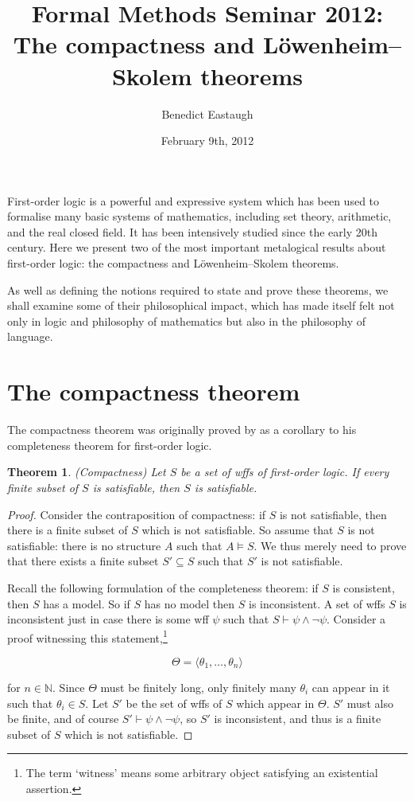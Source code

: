\documentclass[10pt, a4paper, oneside]{article}
\title{Formal Methods Seminar 2012:\\
       The compactness and Löwenheim--Skolem theorems}
\author{Benedict Eastaugh}
\date{February 9th, 2012}
\newtheorem{thm}{Theorem}[section]
\theoremstyle{definition}
\theoremstyle{remark}
\theoremstyle{plain}
\begin{document}
\maketitle

First-order logic is a powerful and expressive system which has been used to
formalise many basic systems of mathematics, including set theory, arithmetic,
and the real closed field. It has been intensively studied since the early 20th
century. Here we present two of the most important metalogical results about
first-order logic: the compactness and Löwenheim--Skolem theorems.

As well as defining the notions required to state and prove these theorems, we
shall examine some of their philosophical impact, which has made itself felt not
only in logic and philosophy of mathematics but also in the philosophy of
language.


\section{The compactness theorem}

The compactness theorem was originally proved by \citet{godel1930} as a
corollary to his completeness theorem for first-order logic.

\begin{thm}
    (Compactness) Let $S$ be a set of wffs of first-order logic. If every finite
    subset of $S$ is satisfiable, then $S$ is satisfiable.
\end{thm}

\begin{proof}
    Consider the contraposition of compactness: if $S$ is not satisfiable, then
    there is a finite subset of $S$ which is not satisfiable. So assume that $S$
    is not satisfiable: there is no structure $A$ such that $A \models S$. We
    thus merely need to prove that there exists a finite subset $S' \subseteq S$
    such that $S'$ is not satisfiable.
    
    Recall the following formulation of the completeness theorem: if $S$ is
    consistent, then $S$ has a model. So if $S$ has no model then $S$ is
    inconsistent. A set of wffs $S$ is inconsistent just in case there is some
    wff $\psi$ such that $S \vdash \psi \wedge \neg\psi$. Consider a proof
    witnessing this statement,\footnote{The term `witness' means some arbitrary
    object satisfying an existential assertion.}
    
    \begin{displaymath}
        \Theta = \langle \theta_1, \dotsc, \theta_n \rangle
    \end{displaymath}
    
    for $n \in \mathbb{N}$. Since $\Theta$ must be finitely long, only finitely
    many $\theta_i$ can appear in it such that $\theta_i \in S$. Let $S'$ be the
    set of wffs of $S$ which appear in $\Theta$. $S'$ must also be finite, and
    of course $S' \vdash \psi \wedge \neg\psi$, so $S'$ is inconsistent, and
    thus is a finite subset of $S$ which is not satisfiable.
\end{proof}
\end{document}
